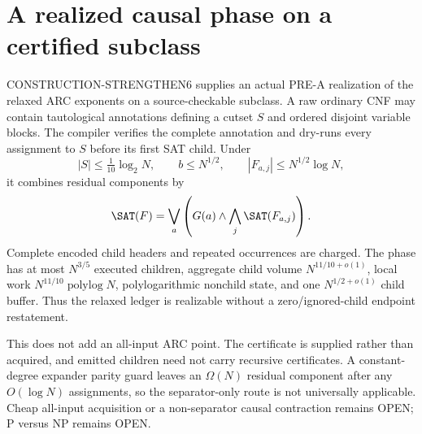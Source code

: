 \section{A realized causal phase on a certified subclass}
\label{sec:construction-strengthen6-arc}

CONSTRUCTION-STRENGTHEN6 supplies an actual PRE-A realization of the relaxed
ARC exponents on a source-checkable subclass.  A raw ordinary CNF may contain
tautological annotations defining a cutset $S$ and ordered disjoint variable
blocks.  The compiler verifies the complete annotation and dry-runs every
assignment to $S$ before its first SAT child.  Under
\[
 |S|\le\tfrac1{10}\log_2N,\qquad b\le N^{1/2},\qquad
 |F_{a,j}|\le N^{1/2}\log N,
\]
it combines residual components by
\[
 \SAT(F)=\bigvee_a\left(G(a)\wedge\bigwedge_j\SAT(F_{a,j})\right).
\]
Complete encoded child headers and repeated occurrences are charged.  The
phase has at most $N^{3/5}$ executed children, aggregate child volume
$N^{11/10+o(1)}$, local work $N^{11/10}\operatorname{polylog}N$, polylogarithmic
nonchild state, and one $N^{1/2+o(1)}$ child buffer.  Thus the relaxed ledger
is realizable without a zero/ignored-child endpoint restatement.

This does not add an all-input ARC point.  The certificate is supplied rather
than acquired, and emitted children need not carry recursive certificates.
A constant-degree expander parity guard leaves an $\Omega(N)$ residual
component after any $O(\log N)$ assignments, so the separator-only route is
not universally applicable.  Cheap all-input acquisition or a non-separator
causal contraction remains OPEN; P versus NP remains OPEN.
